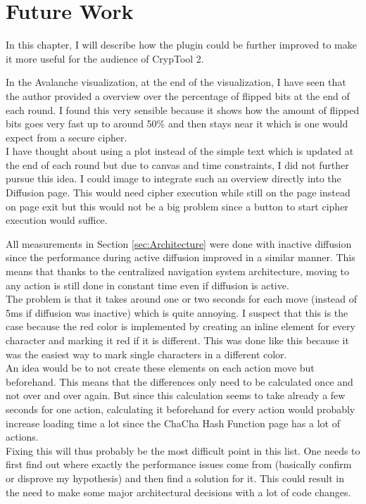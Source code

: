 \chapter{Future Work}
\label{chap:futureWork}

In this chapter, I will describe how the plugin could be further improved to make it more useful for the audience of CrypTool 2.

\begin{description}[style=nextline]

\item[Diffusion: Better overview over flipped bits at the end of each round]

In the Avalanche visualization, at the end of the visualization, I have seen that the author provided a overview over the percentage of flipped bits at the end of each round. I found this very sensible because it shows how the amount of flipped bits goes very fast up to around 50\% and then stays near it which is one would expect from a secure cipher. \\
I have thought about using a plot instead of the simple text which is updated at the end of each round but due to canvas and time constraints, I did not further pursue this idea. I could image to integrate such an overview directly into the Diffusion page. This would need cipher execution while still on the page instead on page exit but this would not be a big problem since a button to start cipher execution would suffice.

\item[Improve performance during diffusion]

All measurements in Section \ref{sec:Architecture} were done with inactive diffusion since the performance during active diffusion improved in a similar manner. This means that thanks to the centralized navigation system architecture, moving to any action is still done in constant time even if diffusion is active. \\
The problem is that it takes around one or two seconds for each move (instead of 5ms if diffusion was inactive) which is quite annoying. I suspect that this is the case because the red color is implemented by creating an inline element for every character and marking it red if it is different. This was done like this because it was the easiest way to mark single characters in a different color. \\
An idea would be to not create these elements on each action move but beforehand. This means that the differences only need to be calculated once and not over and over again. But since this calculation seems to take already a few seconds for one action, calculating it beforehand for every action would probably increase loading time a lot since the ChaCha Hash Function page has a lot of actions. \\
Fixing this will thus probably be the most difficult point in this list. One needs to first find out where exactly the performance issues come from (basically confirm or disprove my hypothesis) and then find a solution for it. This could result in the need to make some major architectural decisions with a lot of code changes.


\end{description}
